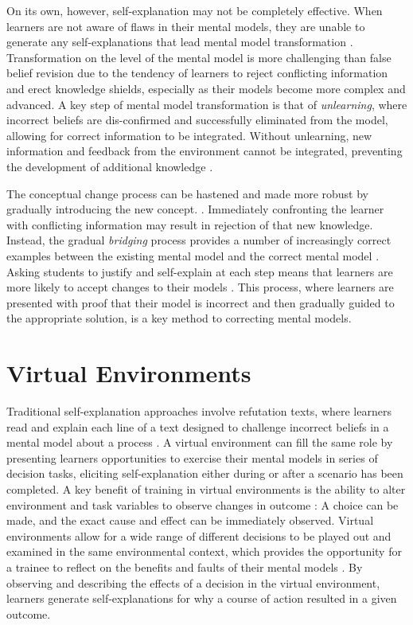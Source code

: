 On its own, however, self-explanation may not be completely effective. When learners are not aware of flaws in their mental models, they are unable to generate any self-explanations \citep{Chi2002} that lead mental model transformation \citep{Chi2008}. Transformation on the level of the mental model is more challenging than false belief revision due to the tendency of learners to reject conflicting information and erect knowledge shields, especially as their models become more complex and advanced. A key step of mental model transformation is that of \emph{unlearning}, where incorrect beliefs are dis-confirmed and successfully eliminated from the model, allowing for correct information to be integrated. Without unlearning, new information and feedback from the environment cannot be integrated, preventing the development of additional knowledge \citep{Klein2006}.

The conceptual change process can be hastened and made more robust by gradually introducing the new concept. \citep{Klein2006}. Immediately confronting the learner with conflicting information may result in rejection of that new knowledge. Instead, the gradual \emph{bridging} process provides a number of increasingly correct examples between the existing mental model and the correct mental model \citep{Brown1989}. Asking students to justify and self-explain at each step means that learners are more likely to accept changes to their models \citep{Brown1989, Chi2008, Chi1994, Klein2006}. This process, where learners are presented with proof that their model is incorrect and then gradually guided to the appropriate solution, is a key method to correcting mental models.

\section{Virtual Environments}

Traditional self-explanation approaches involve refutation texts, where learners read and explain each line of a text designed to challenge incorrect beliefs in a mental model about a process \citep{Chi1994}. A virtual environment can fill the same role by presenting learners opportunities to exercise their mental models in series of decision tasks, eliciting self-explanation either during or after a scenario has been completed. A key benefit of training in virtual environments is the ability to alter environment and task variables to observe changes in outcome \citep{Klein2006}: A choice can be made, and the exact cause and effect can be immediately observed. Virtual environments allow for a wide range of different decisions to be played out and examined in the same environmental context, which provides the opportunity for a trainee to reflect on the benefits and faults of their mental models \citep{Salzman1999}. By observing and describing the effects of a decision in the virtual environment, learners generate self-explanations for why a course of action resulted in a given outcome.

